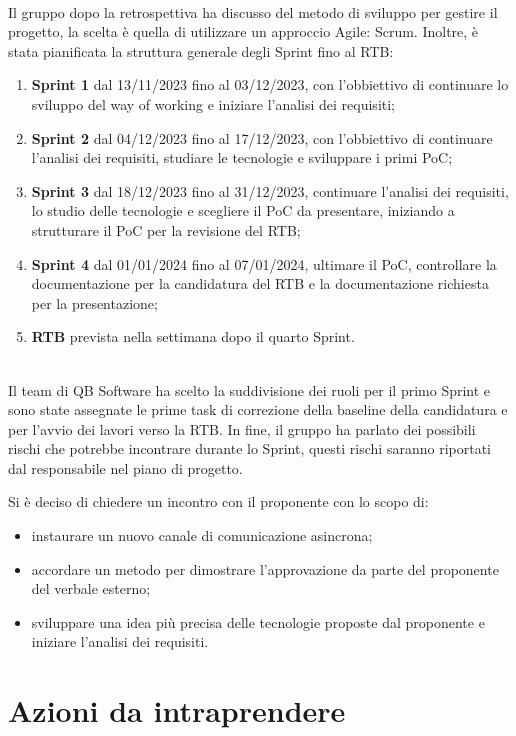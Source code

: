 \documentclass[12pt]{article}
\begin{document}
		\noindent\\
		Il gruppo dopo la retrospettiva ha discusso del metodo di sviluppo per gestire il progetto, la scelta è quella di utilizzare un approccio Agile: Scrum. Inoltre, è stata pianificata la struttura generale degli Sprint fino al RTB:
		\begin{enumerate}
			\item \textbf{Sprint 1} dal 13/11/2023 fino al 03/12/2023, con l'obbiettivo di continuare lo sviluppo del way of working e iniziare l'analisi dei requisiti;
			\item \textbf{Sprint 2} dal 04/12/2023 fino al 17/12/2023, con l'obbiettivo di continuare l'analisi dei requisiti, studiare le tecnologie e sviluppare i primi PoC;
			\item \textbf{Sprint 3} dal 18/12/2023 fino al 31/12/2023, continuare l'analisi dei requisiti, lo studio delle tecnologie e scegliere il PoC da presentare, iniziando a strutturare il PoC per la revisione del RTB;
			\item \textbf{Sprint 4} dal 01/01/2024 fino al 07/01/2024, ultimare il PoC, controllare la documentazione per la candidatura del RTB e la documentazione richiesta per la presentazione;
			\item \textbf{RTB} prevista nella settimana dopo il quarto Sprint.
		\end{enumerate}
		\noindent\\
		Il team di QB Software ha scelto la suddivisione dei ruoli per il primo Sprint e sono state assegnate le prime task di correzione della baseline della candidatura e per l'avvio dei lavori verso la RTB. In fine, il gruppo ha parlato dei possibili rischi che potrebbe incontrare durante lo Sprint, questi rischi saranno riportati dal responsabile nel piano di progetto.
		
		\noindent
		Si è deciso di chiedere un incontro con il proponente con lo scopo di:
		\begin{itemize}
			\item instaurare un nuovo canale di comunicazione asincrona;
			\item accordare un metodo per dimostrare l'approvazione da parte del proponente del verbale esterno;
			\item sviluppare una idea più precisa delle tecnologie proposte dal proponente e iniziare l'analisi dei requisiti.
		\end{itemize}
		
    \section{Azioni da intraprendere}
    
\end{document}
